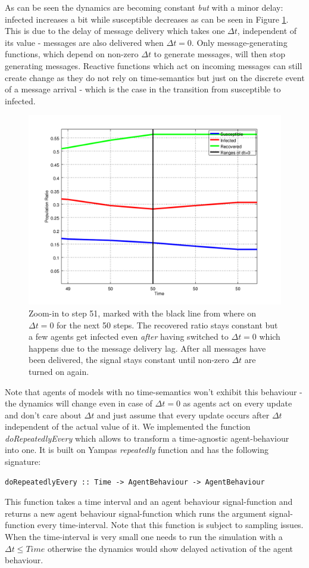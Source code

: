 As can be seen  the dynamics are becoming constant \textit{but} with a minor delay: infected increases a bit while susceptible decreases as can be seen in Figure \ref{fig:sir_abs_zero_dt_zoom}. This is due to the delay of message delivery which takes one $\Delta t$, independent of its value - messages are also delivered when $\Delta t = 0$. Only message-generating functions, which depend on non-zero $\Delta t$ to generate messages, will then stop generating messages. Reactive functions which act on incoming messages can still create change as they do not rely on time-semantics but just on the discrete event of a message arrival - which is the case in the transition from susceptible to infected.

\begin{figure}
	\centering
	\includegraphics[width=.4\textwidth, angle=0]{./shared/fig/dtzero/SIR_ABS_zeroDt_mid_zoom.png}
	\caption{Zoom-in to step 51, marked with the black line from where on $\Delta t = 0$ for the next 50 steps. The recovered ratio stays constant but a few agents get infected even \textit{after} having switched to $\Delta t = 0$ which happens due to the message delivery lag. After all messages have been delivered, the signal stays constant until non-zero $\Delta t$ are turned on again.}
	\label{fig:sir_abs_zero_dt_zoom}
\end{figure}

Note that agents of models with no time-semantics won't exhibit this behaviour - the dynamics will change even in case of $\Delta t = 0$ as agents act on every update and don't care about $\Delta t$ and just assume that every update occurs after $\Delta t$ independent of the actual value of it. We implemented the function \textit{doRepeatedlyEvery} which allows to transform a time-agnostic agent-behaviour into one. It is built on Yampas \textit{repeatedly} function and has the following signature:

\begin{verbatim}
doRepeatedlyEvery :: Time -> AgentBehaviour -> AgentBehaviour
\end{verbatim}

This function takes a time interval and an agent behaviour signal-function and returns a new agent behaviour signal-function which runs the argument signal-function every time-interval. Note that this function is subject to sampling issues. When the time-interval is very small one needs to run the simulation with a $\Delta t \leq Time$ otherwise the dynamics would show delayed activation of the agent behaviour.